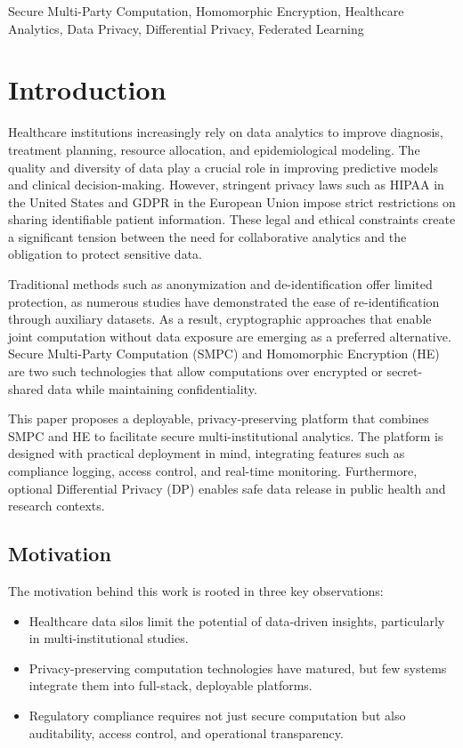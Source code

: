 \documentclass[conference]{IEEEtran}
\begin{document}
\begin{IEEEkeywords}
Secure Multi-Party Computation, Homomorphic Encryption, Healthcare Analytics, Data Privacy, Differential Privacy, Federated Learning
\end{IEEEkeywords}

\section{Introduction}
Healthcare institutions increasingly rely on data analytics to improve diagnosis, treatment planning, resource allocation, and epidemiological modeling. The quality and diversity of data play a crucial role in improving predictive models and clinical decision-making. However, stringent privacy laws such as HIPAA in the United States and GDPR in the European Union impose strict restrictions on sharing identifiable patient information. These legal and ethical constraints create a significant tension between the need for collaborative analytics and the obligation to protect sensitive data.

Traditional methods such as anonymization and de-identification offer limited protection, as numerous studies have demonstrated the ease of re-identification through auxiliary datasets. As a result, cryptographic approaches that enable joint computation without data exposure are emerging as a preferred alternative. Secure Multi-Party Computation (SMPC) and Homomorphic Encryption (HE) are two such technologies that allow computations over encrypted or secret-shared data while maintaining confidentiality.

This paper proposes a deployable, privacy-preserving platform that combines SMPC and HE to facilitate secure multi-institutional analytics. The platform is designed with practical deployment in mind, integrating features such as compliance logging, access control, and real-time monitoring. Furthermore, optional Differential Privacy (DP) enables safe data release in public health and research contexts.

\subsection{Motivation}
The motivation behind this work is rooted in three key observations:
\begin{itemize}
    \item Healthcare data silos limit the potential of data-driven insights, particularly in multi-institutional studies.
    \item Privacy-preserving computation technologies have matured, but few systems integrate them into full-stack, deployable platforms.
    \item Regulatory compliance requires not just secure computation but also auditability, access control, and operational transparency.
\end{itemize}
\end{document}
